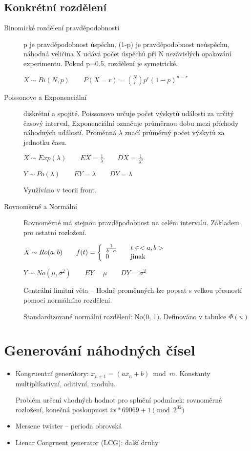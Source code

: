 \documentclass[a4paper, 11pt]{report}
\begin{document}
\subsection{Konkrétní rozdělení}
\begin{description}
	\item[Binomické rozdělení pravděpodobnosti] p je pravděpodobnost úspěchu, (1-p) je pravděpodobnost neúspěchu, náhodná veličina X udává počet úspěchů při N nezávislých opakování experimentu. Pokud p=0.5, rozdělení je symetrické.
	
	$X \sim Bi(N, p) \qquad P(X = r) = {N \choose r} p^r (1-p)^{n-r}$
	
	\item[Poissonovo a Exponenciální] diskrétní a spojité. Poissonovo určuje počet výskytů události za určitý časový interval, Exponenciální označuje průměrnou dobu mezi příchody náhodných událostí. Proměnná $\lambda$ značí průměrný počet výskytů za jednotku času.
	
	$X \sim Exp(\lambda) \qquad EX = \frac{1}{\lambda} \qquad DX = \frac{1}{\lambda^2}$ 
	
	$Y \sim Po(\lambda) \qquad EY = \lambda \qquad DY = \lambda$
	
	Využíváno v teorii front.
	
	\item[Rovnoměrné a Normální] Rovnoměrné má stejnou pravděpodobnost na celém intervalu. Základem pro ostatní rozložení.
	
	$X \sim Ro(a,b) \qquad f(t) = \left\{ 
   \begin{array}{l l}
     \frac{1}{b-a}  & \quad t \in <a,b>\\
     0  & \quad \text{jinak}\\
   \end{array} \right.$
   
   $Y \sim No(\mu, \sigma^2) \qquad EY = \mu \qquad DY = \sigma^2$
   
   Centrální limitní věta -- Hodně proměnných lze popsat s velkou přesností pomocí normálního rozdělení.
   
   Standardizované normální rozdělení: No(0, 1). Definováno v tabulce $\Phi(u)$
\end{description}

\section{Generování náhodných čísel}

\begin{itemize}
	\item Kongruentní generátory: $x_{n+1} = (a x_n + b) \bmod m$. Konstanty multiplikativní, aditivní, modulu.
	
	Problém určení vhodných hodnot pro splnění podmínek: rovnoměrné rozložení, konečná posloupnost $ix * 69069 + 1 \pmod{ 2^{32} }$
	
	\item Mersene twister -- perioda obrovská
	\item Lienar Congruent generator (LCG): další druhy
\end{itemize}
\end{document}
